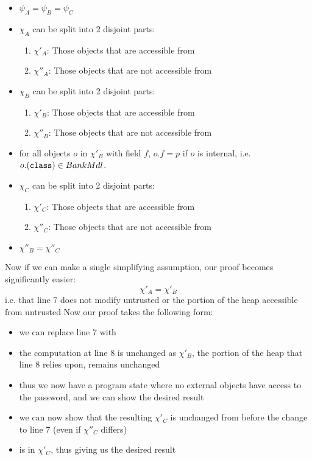 \begin{itemize}
\item
$\psi_A = \psi_B = \psi_C$
\item
$\chi_A$ can be split into 2 disjoint parts:
\begin{enumerate}
\item
$\chi'_A$: Those objects that are accessible from 
\item
$\chi''_A$: Those objects that are not accessible from 
\end{enumerate}
\item
$\chi_B$ can be split into 2 disjoint parts:
\begin{enumerate}
\item
$\chi'_B$: Those objects that are accessible from 
\item
$\chi''_B$: Those objects that are not accessible from 
\end{enumerate}
\item
for all objects $o$ in $\chi'_B$ with field $f$, $o.f = p$ if $o$ is internal, i.e. $o.({\texttt{class}}) \in BankMdl$.
\item
$\chi_C$ can be split into 2 disjoint parts:
\begin{enumerate}
\item
$\chi'_C$: Those objects that are accessible from 
\item
$\chi''_C$: Those objects that are not accessible from 
\end{enumerate}
\item
$\chi''_B = \chi''_C$
\end{itemize}
Now if we can make a single simplifying assumption, our proof becomes significantly easier:
$$\chi'_A = \chi'_B$$
i.e. that line 7 does not modify untrusted or the portion of the heap accessible from untrusted
Now our proof takes the following form:
\begin{itemize}
\item
we can replace line 7 with 
\item
the computation at line 8 is unchanged as $\chi'_B$, the portion of the heap that line 8 relies upon, remains unchanged
\item 
thus we now have a program state where no external objects have access to the password, and we can show the desired result
\item
we can now show that the resulting $\chi'_C$ is unchanged from before the change to line 7 (even if $\chi''_C$ differs)
\item
{} is in $\chi'_C$, thus giving us the desired result
\end{itemize}
